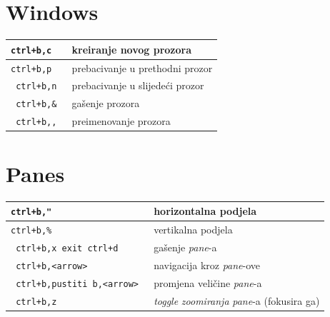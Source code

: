 \documentclass[10pt]{article}
\begin{document}
    \section*{\color{ForestGreen} Windows}
    \begin{tabular}{|>{\tt}p{9.00cm}|>{}p{15.50cm}|}
        \hline
        ctrl+b,c                                    &   kreiranje novog prozora                             \\ \hline
        ctrl+b,p                                    &   prebacivanje u prethodni prozor                     \\ \hline
        ctrl+b,n                                    &   prebacivanje u slijedeći prozor                     \\ \hline
        ctrl+b,\&                                   &   gašenje prozora                                     \\ \hline
        ctrl+b,,                                    &   preimenovanje prozora                               \\ \hline
    \end{tabular}

    \section*{\color{ForestGreen} Panes}
    \begin{tabular}{|>{\tt}p{9.00cm}|>{}p{15.50cm}|}
        \hline
        ctrl+b,"                                    &   horizontalna podjela                                \\ \hline
        ctrl+b,\%                                   &   vertikalna podjela                                  \\ \hline
        ctrl+b,x exit ctrl+d                        &   gašenje \textit{pane}-a                             \\ \hline
        ctrl+b,<arrow>                              &   navigacija kroz \textit{pane}-ove                   \\ \hline
        ctrl+b,pustiti b,<arrow>                    &   promjena veličine \textit{pane}-a                   \\ \hline
        ctrl+b,z                                    &   \textit{toggle} \textit{zoomiranja} \textit{pane}-a (fokusira ga)     \\ \hline
    \end{tabular}

\end{document}
